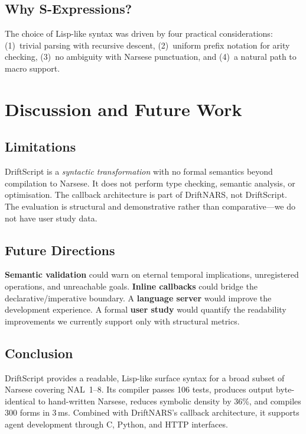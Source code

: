 \documentclass[11pt,a4paper]{article}
\begin{document}
\subsection{Why S-Expressions?}

The choice of Lisp-like syntax was driven by four practical considerations:
(1)~trivial parsing with recursive descent, (2)~uniform prefix notation for
arity checking, (3)~no ambiguity with Narsese punctuation, and (4)~a natural
path to macro support.

\section{Discussion and Future Work}
\label{sec:conclusion}

\subsection{Limitations}

DriftScript is a \emph{syntactic transformation} with no formal semantics
beyond compilation to Narsese. It does not perform type checking, semantic
analysis, or optimisation. The callback architecture is part of DriftNARS, not
DriftScript. The evaluation is structural and demonstrative rather than
comparative---we do not have user study data.

\subsection{Future Directions}

\textbf{Semantic validation} could warn on eternal temporal implications,
unregistered operations, and unreachable goals. \textbf{Inline callbacks}
could bridge the declarative/imperative boundary. A \textbf{language server}
would improve the development experience. A formal \textbf{user study} would
quantify the readability improvements we currently support only with
structural metrics.

\subsection{Conclusion}

DriftScript provides a readable, Lisp-like surface syntax for a broad subset
of Narsese covering NAL~1--8. Its compiler passes 106 tests, produces output
byte-identical to hand-written Narsese, reduces symbolic density by 36\%, and
compiles 300 forms in 3\,ms. Combined with DriftNARS's callback architecture,
it supports agent development through C, Python, and HTTP interfaces.
\end{document}
